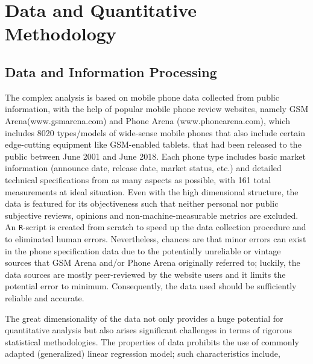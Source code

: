 \documentclass[utf8,english]{gradu3}
\begin{document}
\chapter{Data and Quantitative Methodology}

\section{Data and Information Processing}

The complex analysis is based on mobile phone data collected from public information, with the help of popular mobile phone review websites, namely GSM Arena(www.gsmarena.com) and Phone Arena (www.phonearena.com), which includes 8020 types/models of wide-sense mobile phones that also include certain edge-cutting equipment like GSM-enabled tablets. that had been released to the public between June 2001 and June 2018. Each phone type includes basic market information (announce date, release date, market status, etc.) and detailed technical specifications from as many aspects as possible, with 161 total measurements at ideal situation. Even with the high dimensional structure, the data is featured for its objectiveness such that neither personal nor public subjective reviews, opinions and non-machine-measurable metrics are excluded. An \texttt{R}-script is created from scratch to speed up the data collection procedure and to eliminated human errors. Nevertheless, chances are that minor errors can exist in the phone specification data due to the potentially unreliable or vintage sources that GSM Arena and/or Phone Arena originally referred to; luckily, the data sources are mostly peer-reviewed by the website users and it limits the potential error to minimum. Consequently, the data used should be sufficiently reliable and accurate.

The great dimensionality of the data not only provides a huge potential for quantitative analysis but also arises significant challenges in terms of rigorous statistical methodologies. The properties of data prohibits the use of commonly adapted (generalized) linear regression model; such characteristics include,
\end{document}
